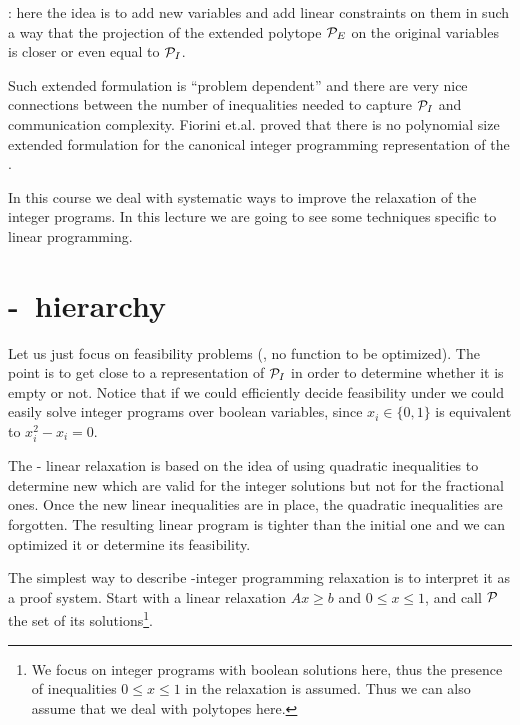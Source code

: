 \documentclass[a4paper,twoside,justified]{tufte-handout}
\begin{document}
: here the idea is to add new
variables and add linear constraints on them in such a way that the
projection of the extended polytope $\mathcal{P}_{E}$ on the original
variables is closer or even equal to $ \mathcal{P}_{I} $.

Such extended formulation is ``problem dependent'' and there are very
nice connections between the number of inequalities needed to capture
$ \mathcal{P}_{I} $ and communication complexity. Fiorini
et.al.\cite{fiorini2012linear} proved that there is no polynomial size
extended formulation for the canonical integer programming
representation of the .

In this course we deal with systematic ways to improve the relaxation
of the integer programs. In this lecture we are going to see some
techniques specific to linear programming.

\section{\Lovasz-\Schrijver\ hierarchy}

Let us just focus on feasibility problems (\ie, no function to be
optimized). The point is to get close to a representation of $
\mathcal{P}_{I} $ in order to determine whether it is empty or not. Notice
that if we could efficiently decide feasibility under
 we could easily solve integer
programs over boolean variables, since $ x_{i}\in\{0,1\} $ is
equivalent to $ x^{2}_{i} - x_{i} =0 $.

The \Lovasz-\Schrijver\cite{lovasz1991cones} linear relaxation is
based on the idea of using quadratic inequalities to determine new
 which are valid for the integer
solutions but not for the fractional ones. Once the new linear
inequalities are in place, the quadratic inequalities are forgotten.
The resulting linear program is tighter than the initial one and we
can optimized it or determine its feasibility.

The simplest way to describe \Lovasz-\Schrijver integer programming
relaxation is to interpret it as a proof system. Start with a linear
relaxation $ Ax \geq b$ and $ 0 \leq x \leq 1$, and call $ \mathcal{P} $ the set
of its solutions\footnote{We focus on integer programs with boolean
  solutions here, thus the presence of inequalities $ 0 \leq x \leq 1
  $ in the relaxation is assumed. Thus we can also assume that we deal
  with polytopes here.}.
\end{document}

